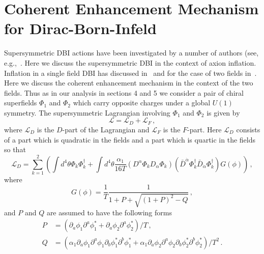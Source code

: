 \documentclass[12pt]{article}
\begin{document}
\section{Coherent Enhancement Mechanism for Dirac-Born-Infeld \label{sec:DBI}}
Supersymmetric DBI actions have been investigated by a number of authors (see, e.g.,~\cite{Khoury:2010gb, Khoury:2011da, Baumann:2011nk, Baumann:2011nm, Rocek:1997hi, Tseytlin:1999dj, Ito:2007hy, Billo:2008sp, Sasaki:2012ka, Aoki:2016tod}.
Here we discuss the supersymmetric DBI in the context of axion inflation.
Inflation in a single field DBI has discussed in~\cite{Sasaki:2012ka} and for the case of two fields in~\cite{Nath:2018xxe}.
Here we discuss the coherent enhancement mechanism in the context of the two fields.
Thus as in our analysis in sections 4 and 5 we consider a pair of chiral superfields $\Phi_1$ and $\Phi_2$ which carry opposite charges under a global $U\left(1\right)$ symmetry.
The supersymmetric Lagrangian involving $\Phi_1$ and $\Phi_2$ is given by
\begin{equation} \label{eq:DBI:lagrangianTerms}
  \mathcal{L} = \mathcal{L}_D + \mathcal{L}_F\,,
\end{equation}
where $\mathcal{L}_D$ is the $D$-part of the Lagrangian and $\mathcal{L}_F$ is the $F$-part.
Here $\mathcal{L}_D$ consists of a part which is quadratic in the fields and a part which is quartic in the fields so that
\begin{equation} \label{eq:DBI:lagrangianD}
  \mathcal{L}_D = \sum_{k = 1}^2 \left(\int d^4 \theta \Phi_k \Phi_k^\dagger
    + \int d^4 \theta \frac{\alpha_1}{16 T}
      \left(D^\alpha \Phi_k D_\alpha \Phi_k\right)
      \left({\bar D}^{\dot\alpha} \Phi_k^\dagger {\bar D}_{\dot\alpha} \Phi_k^\dagger\right)
      G\left(\phi\right)\right)\,,
\end{equation}
where
\begin{equation}
  G\left(\phi\right) = \frac{1}{T} \frac{1}{1 + P + \sqrt{\left(1 + P\right)^2 - Q}}\,,
\end{equation}
and $P$ and $Q$ are assumed to have the following forms
\begin{equation} \label{eq:DBI:PQ}
  \begin{aligned}
    P &= \left(
        \partial_a \phi_1 \partial^a \phi^*_1
      + \partial_a \phi_2 \partial^a \phi^*_2
    \right) / T\,,\\
    Q &= \left(
        \alpha_1 \partial_a \phi_1 \partial^a \phi_1 \partial_b \phi^*_1 \partial^b \phi^*_1
      + \alpha_1 \partial_a \phi_2 \partial^a \phi_2 \partial_b \phi^*_2 \partial^b \phi^*_2
    \right) / T^2\,.
  \end{aligned}
\end{equation}
\end{document}
